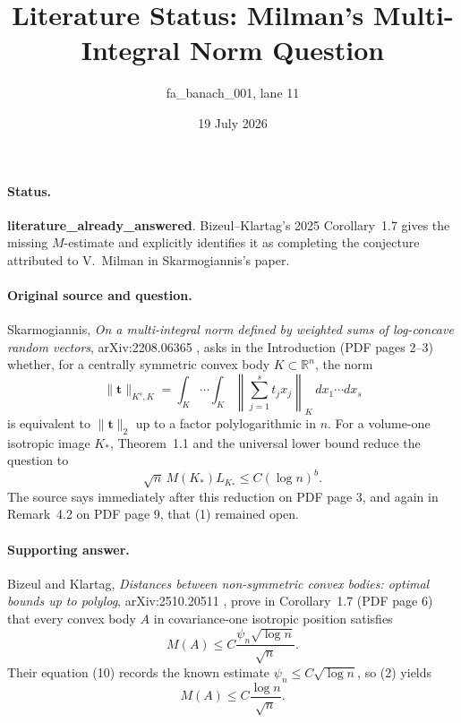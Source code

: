 \documentclass[11pt]{article}
\title{Literature Status: Milman's Multi-Integral Norm Question}
\author{fa\_banach\_001, lane 11}
\date{19 July 2026}
\begin{document}
\maketitle

\paragraph{Status.}
\textbf{literature\_already\_answered}.  Bizeul--Klartag's 2025
Corollary~1.7 gives the missing $M$-estimate and explicitly identifies it as
completing the conjecture attributed to V.~Milman in Skarmogiannis's paper.

\paragraph{Original source and question.}
Skarmogiannis, \emph{On a multi-integral norm defined by weighted sums of
log-concave random vectors}, arXiv:2208.06365 \cite{S}, asks in the
Introduction (PDF pages 2--3) whether, for a centrally symmetric convex body
$K\subset\mathbb R^n$, the norm
\[
  \|\mathbf t\|_{K^s,K}
  =\int_K\!\cdots\!\int_K
    \left\|\sum_{j=1}^s t_jx_j\right\|_K
    \,dx_1\cdots dx_s
\]
is equivalent to $\|\mathbf t\|_2$ up to a factor polylogarithmic in $n$.
For a volume-one isotropic image $K_*$, Theorem~1.1 and the universal lower
bound reduce the question to
\begin{equation}
  \sqrt n\,M(K_*)L_{K_*}\le C(\log n)^b. \tag{1}
\end{equation}
The source says immediately after this reduction on PDF page 3, and again in
Remark~4.2 on PDF page 9, that (1) remained open.

\paragraph{Supporting answer.}
Bizeul and Klartag, \emph{Distances between non-symmetric convex bodies:
optimal bounds up to polylog}, arXiv:2510.20511 \cite{BK}, prove in
Corollary~1.7 (PDF page 6) that every convex body $A$ in covariance-one
isotropic position satisfies
\begin{equation}
  M(A)\le C\frac{\psi_n\sqrt{\log n}}{\sqrt n}. \tag{2}
\end{equation}
Their equation (10) records the known estimate
$\psi_n\le C\sqrt{\log n}$, so (2) yields
\begin{equation}
  M(A)\le C\frac{\log n}{\sqrt n}. \tag{3}
\end{equation}
\end{document}
